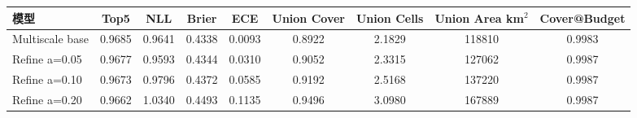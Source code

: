 \begin{tabular}{lcccccccc}
\toprule
模型 & Top5 & NLL & Brier & ECE & Union Cover & Union Cells & Union Area km$^2$ & Cover@Budget \\
\midrule
Multiscale base & 0.9685 & 0.9641 & 0.4338 & 0.0093 & 0.8922 & 2.1829 & 118810 & 0.9983 \\
Refine a=0.05 & 0.9677 & 0.9593 & 0.4344 & 0.0310 & 0.9052 & 2.3315 & 127062 & 0.9987 \\
Refine a=0.10 & 0.9673 & 0.9796 & 0.4372 & 0.0585 & 0.9192 & 2.5168 & 137220 & 0.9987 \\
Refine a=0.20 & 0.9662 & 1.0340 & 0.4493 & 0.1135 & 0.9496 & 3.0980 & 167889 & 0.9987 \\
\bottomrule
\end{tabular}
